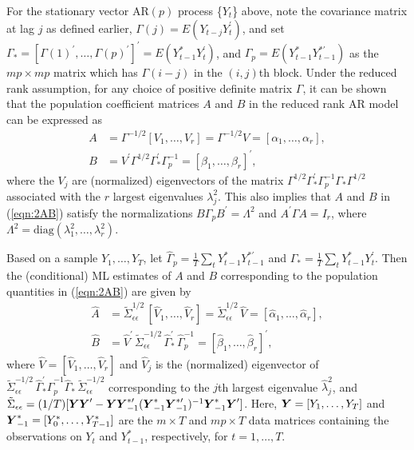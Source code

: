 For the stationary vector AR$(p)$ process \{$Y_t$\} above, note the covariance matrix at lag $j$ as defined earlier, $\Gamma (j) = E (Y_{t-j} Y_t^{\prime})$, and set $\Gamma_{*} = [\Gamma (1)^{\prime},\ldots,\Gamma (p)^{\prime}]^{\prime} = E(Y_{t-1}^{*} Y_t^{\prime})$, and $\Gamma_p = E(Y_{t-1}^{*} Y_{t-1}^{* \prime})$ as the $mp \times mp$ matrix which has $\Gamma (i-j)$ in the $(i,j)$th block.  Under the reduced rank assumption, for any choice of positive definite matrix $\Gamma$, it can be shown that the population coefficient matrices $A$ and $B$ in the reduced rank AR model can be expressed as
	\begin{equation}\label{eqn:2AB}
	\begin{split}
	A&= \Gamma^{-1/2}[V_{1}, \ldots, V_{r}] = \Gamma^{-1/2}V =
[\alpha_{1}, \ldots, \alpha_{r}], \\
	B&= V^{\prime}\Gamma^{1/2} \Gamma_{*}^{\prime} \Gamma_p^{-1} = [\beta_{1},
\ldots, \beta_{r}]^{\prime} ,
	\end{split}
	\end{equation}
where the $V_j$ are (normalized) eigenvectors of the matrix $\Gamma^{1/2}\Gamma_{*}^{\prime} \Gamma_p^{-1} \Gamma_{*} \Gamma^{1/2}$ associated with the $r$ largest eigenvalues $\lambda_j^2$.  This also implies that $A$ and $B$ in (\ref{eqn:2AB}) satisfy the normalizations $B \Gamma_p B^{\prime} = \Lambda^2$ and $A^{\prime} \Gamma A = I_r$, where $\Lambda^2 = \text{diag}(\lambda_1^2 ,\ldots,\lambda_r^2)$.


Based on a sample $Y_1 ,\ldots, Y_T$, let $\hat{\Gamma}_p=\frac{1}{T}\sum_t Y_{t-1}^{*} Y_{t-1}^{*\prime}$ and $\hat{\Gamma}_{*} = \frac{1}{T}\sum_t Y_{t-1}^{*} Y_t^{\prime}$. Then the (conditional) ML estimates of $A$ and $B$ corresponding to the population quantities in (\ref{eqn:2AB}) are given by
	\begin{equation}\label{eqn:2AhatBhat}
	\begin{split}
	\hat{A}&= \tilde{\Sigma}_{\epsilon \epsilon}^{1/2} \, [\hat{V}_{1}, \ldots, \hat{V}_{r}] =  \tilde{\Sigma}_{\epsilon \epsilon}^{1/2}\, \hat{V} = [\hat{\alpha}_{1}, \ldots, \hat{\alpha}_{r}], \\
	\hat{B}&= \hat{V}^{\prime}\, \tilde{\Sigma}_{\epsilon \epsilon}^{-1/2}\, \hat{\Gamma}_{*}^{\prime}\,\hat{\Gamma}_p^{-1} = [\hat{\beta}_{1}, \ldots, \hat{\beta}_{r}]^{\prime},
	\end{split}
	\end{equation}
where $\hat{V} = [\hat{V}_1,\ldots,\hat{V}_r]$ and $\hat{V}_j$ is the (normalized) eigenvector of $\tilde{\Sigma}_{\epsilon \epsilon}^{-1/2}\, \hat{\Gamma}_{*}^{\prime} \hat{\Gamma}_p^{-1} \hat{\Gamma}_{*} \, \tilde{\Sigma}_{\epsilon \epsilon}^{-1/2}$ corresponding to the $j$th largest eigenvalue $\hat{\lambda}_j^2$, and $\tilde{\Sigma}_{\epsilon \epsilon} = (1/T) [\mbox{\boldmath{$Y$}} \mbox{\boldmath{$Y$}}^{\prime} - \mbox{\boldmath{$Y$}} \mbox{\boldmath{$Y$}}_{-1}^{* \prime} (\mbox{\boldmath{$Y$}}_{-1}^{*} \mbox{\boldmath{$Y$}}_{-1}^{* \prime})^{-1} \mbox{\boldmath{$Y$}}_{-1}^{*} \mbox{\boldmath{$Y$}}^{\prime} ]$.  Here, $\mbox{\boldmath{$Y$}} = [Y_1,\ldots,Y_T]$ and $\mbox{\boldmath{$Y$}}_{-1}^{*} = [Y_0^{*},\ldots,Y_{T-1}^{*}]$ are the $m \times T$ and $mp \times T$ data matrices containing the observations on $Y_t$ and $Y_{t-1}^{*}$, respectively, for $t = 1,\ldots, T$.


